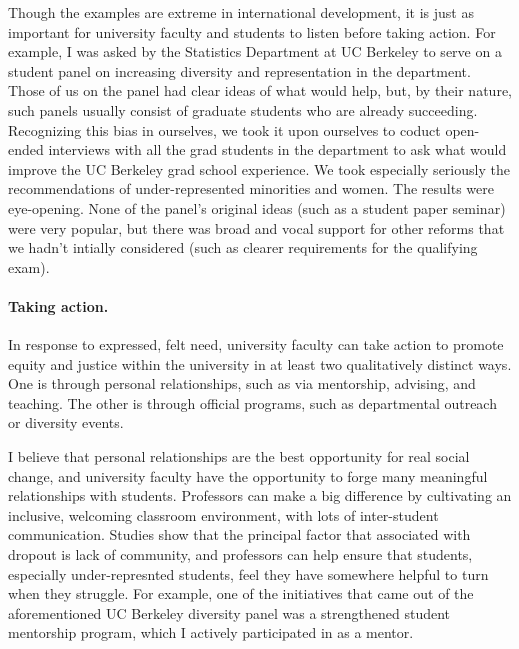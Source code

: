 Though the examples are extreme in international development, it is just as
important for university faculty and students to listen before taking action.
For example, I was asked by the Statistics Department at UC Berkeley to serve on
a student panel on increasing diversity and representation in the department.
Those of us on the panel had clear ideas of what would help, but, by their
nature, such panels usually consist of graduate students who are already
succeeding. Recognizing this bias in ourselves, we took it upon ourselves to
coduct open-ended interviews with all the grad students in the department to ask
what would improve the UC Berkeley grad school experience.  We took especially
seriously the recommendations of under-represented minorities and women. The
results were eye-opening.  None of the panel's original ideas (such as a student
paper seminar) were very popular, but there was broad and vocal support for
other reforms that we hadn't intially considered (such as clearer requirements
for the qualifying exam).

\paragraph{Taking action.}
%
In response to expressed, felt need, university faculty can take action to
promote equity and justice within the university in at least two qualitatively
distinct ways.  One is through personal relationships, such as via mentorship,
advising, and teaching.  The other is through official programs, such as
departmental outreach or diversity events.

I believe that personal relationships are the best opportunity for real social
change, and university faculty have the opportunity to forge many meaningful
relationships with students.  Professors can make a big difference by
cultivating an inclusive, welcoming classroom environment, with lots of
inter-student communication.  Studies show that the principal factor that
associated with dropout is lack of community, and professors can help ensure
that students, especially under-represnted students, feel they have somewhere
helpful to turn when they struggle.  For example, one of the initiatives that
came out of the aforementioned UC Berkeley diversity panel was a strengthened
student mentorship program, which I actively participated in as a mentor.

